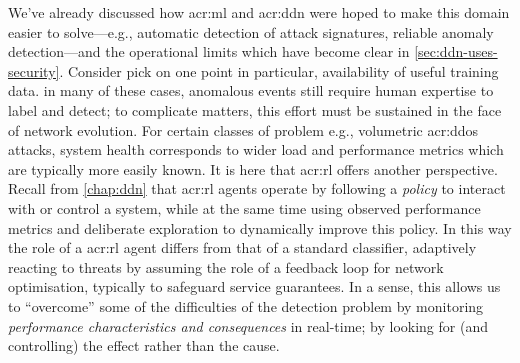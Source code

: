 
We've already discussed how \gls{acr:ml} and \gls{acr:ddn} were hoped to make this domain easier to solve---e.g., automatic detection of attack signatures, reliable anomaly detection---and the operational limits which have become clear in \cref{sec:ddn-uses-security}.
Consider pick on one point in particular, availability of useful training data.
in many of these cases, anomalous events still require human expertise to label and detect; to complicate matters, this effort must be sustained in the face of network evolution.
For certain classes of problem e.g., volumetric \gls{acr:ddos} attacks, system health corresponds to wider load and performance metrics which are typically more easily known.
It is here that \gls{acr:rl} offers another perspective.
Recall from \cref{chap:ddn} that \gls{acr:rl} agents operate by following a \emph{policy} to interact with or control a system, while at the same time using observed performance metrics and deliberate exploration to dynamically improve this policy.
In this way the role of a \gls{acr:rl} agent differs from that of a standard classifier, adaptively reacting to threats by assuming the role of a feedback loop for network optimisation, typically to safeguard service guarantees.
In a sense, this allows us to ``overcome'' some of the difficulties of the detection problem by monitoring \emph{performance characteristics and consequences} in real-time; by looking for (and controlling) the effect rather than the cause.


